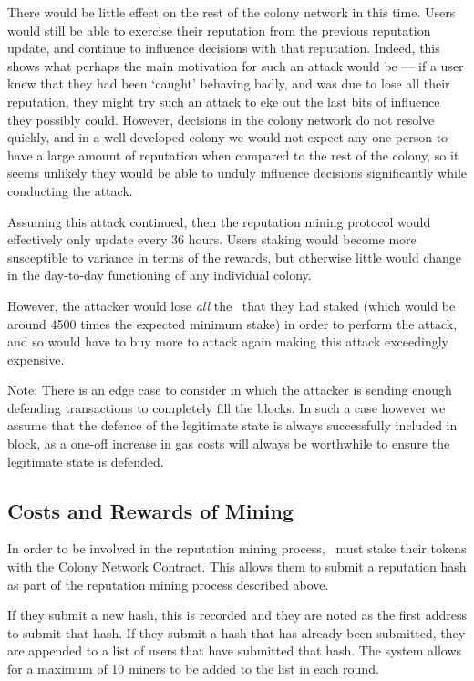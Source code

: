 There would be little effect on the rest of the colony network in this time. Users would still be able to exercise their reputation from the previous reputation update, and continue to influence decisions with that reputation. Indeed, this shows what perhaps the main motivation for such an attack would be --- if a user knew that they had been `caught' behaving badly, and was due to lose all their reputation, they might try such an attack to eke out the last bits of influence they possibly could. However, decisions in the colony network do not resolve quickly, and in a well-developed colony we would not expect any one person to have a large amount of reputation when compared to the rest of the colony, so it seems unlikely they would be able to unduly influence decisions significantly while conducting the attack.

Assuming this attack continued, then the reputation mining protocol would effectively only update every 36 hours. Users staking would become more susceptible to variance in terms of the rewards, but otherwise little would change in the day-to-day functioning of any individual colony. 

However, the attacker would lose \emph{all} the \rct\ that they had staked (which would be around 4500 times the expected minimum stake) in order to perform the attack, and so would have to buy more to attack again making this attack exceedingly expensive.


Note: There is an edge case to consider in which the attacker is sending enough defending transactions to completely fill the blocks. In such a case however we assume that the defence of the legitimate state is always successfully included in block, as a one-off increase in gas costs will always be worthwhile to ensure the legitimate state is defended.  

\subsection{Costs and Rewards of Mining}\label{subsec:mining-costs-and-rewards}
In order to be involved in the reputation mining process, \rcths\ must stake their tokens with the Colony Network Contract. This allows them to submit a reputation hash as part of the reputation mining process described above.

If they submit a new hash, this is recorded and they are noted as the first address to submit that hash. If they submit a hash that has already been submitted, they are appended to a list of users that have submitted that hash. The system allows for a maximum of 10 miners to be added to the list in each round.

